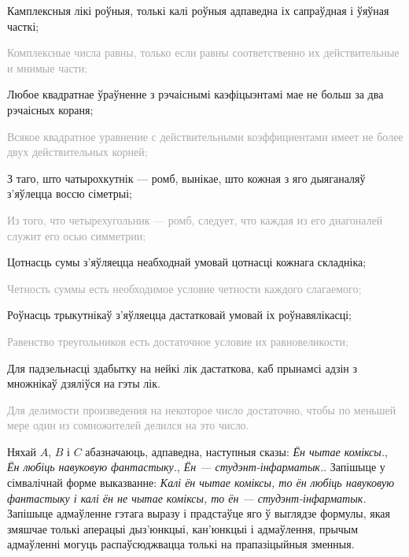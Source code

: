 \documentclass[12pt,twoside]{article}
\newcommand{\ruText}[1]{{\scriptsize \textcolor{darkgray}{#1} \par}}
\renewenvironment{itemize}
{\begin{list}
             {\labelitemi}%
             {\setlength{\labelwidth}{1.3em}%
              \setlength{\labelsep}{0.7em}%
              \setlength{\itemindent}{0em}%
              \setlength{\listparindent}{3em}%
              \setlength{\leftmargin}{2em}%
              \setlength{\rightmargin}{0em}%
              \setlength{\parsep}{0ex}%
              \setlength{\topsep}{0.5ex}%
              \setlength{\itemsep}{1ex}%
             }%
}
{\end{list}}%
\begin{document}
\begin{itemize}
\begin{itemize}
\item[(е)] Камплексныя лікі роўныя, толькі калі роўныя адпаведна іх сапраўдная і ўяўная часткі; \\
\ruText{ Комплексные числа равны, только если равны соответственно их действительные и мнимые части; }

\item[(ж)] Любое квадратнае ўраўненне з рэчаіснымі каэфіцыэнтамі мае не больш за два рэчаісных кораня; \\
\ruText{ Всякое квадратное уравнение с действительными коэффициентами имеет не более двух действительных корней; }

\item[(з)] З таго, што чатырохкутнік --- ромб, вынікае, што кожная з яго дыяганаляў з'яўлецца воссю сіметрыі; \\
\ruText{ Из того, что четырехугольник --- ромб, следует, что каждая из его диагоналей служит его осью симметрии; }

\item[(і)] Цотнасць сумы з'яўляецца неабходнай умовай цотнасці кожнага складніка; \\
\ruText{ Четность суммы есть необходимое условие четности каждого слагаемого; }

\item[(к)] Роўнасць трыкутнікаў з'яўляецца дастатковай умовай іх роўнавялікасці; \\
\ruText{ Равенство треугольников есть достаточное условие их равновеликости; }

\item[(л)] Для падзельнасці здабытку на нейкі лік дастаткова, каб прынамсі адзін з множнікаў дзяліўся на гэты лік. \\
\ruText{ Для делимости произведения на некоторое число достаточно, чтобы по меньшей мере один из сомножителей делился на это число. }

\end{itemize}

\item[2.] Няхай $A$, $B$ і $C$ абазначаюць, адпаведна, наступныя сказы:
\textit{\guillemotleft Ён чытае коміксы.\guillemotright},
\textit{\guillemotleft Ён любіць навуковую фантастыку.\guillemotright},
\textit{\guillemotleft Ён --- студэнт-інфарматык.\guillemotright}.
Запішыце у сімвалічнай форме выказванне: \textit{\guillemotleft Калі ён чытае коміксы,
то ён любіць навуковую фантастыку і калі ён не чытае коміксы, то ён ---
студэнт-інфарматык.\guillemotright} Запішыце адмаўленне гэтага выразу і прадстаўце яго ў выглядзе формулы,
якая змяшчае толькі аперацыі дыз'юнкцыі, кан'юнкцыі і адмаўлення, прычым адмаўленні могуць распаўсюджвацца
толькі на прапазіцыйныя зменныя.


\end{itemize}
\end{document}
